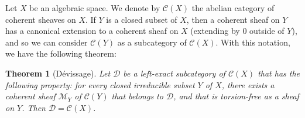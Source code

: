 \documentclass{article}
\theoremstyle{plain}
\newtheorem*{theorem}{Theorem}
\theoremstyle{definition}
\newcommand{\sh}{\mathscr}
\newcommand{\cat}{\mathcal}
\newcommand{\oldpage}[1]{\marginpar{\footnotesize$\Big\vert$ \textit{p.~#1}}}
\begin{document}
Let $X$ be an algebraic space.
We denote by $\cat{C}(X)$ the abelian category of coherent sheaves on $X$.
If $Y$ is a closed subset of $X$, then a coherent sheaf on $Y$ has a canonical extension to a coherent sheaf on $X$ (extending by $0$ outside of $Y$), and so we can consider $\cat{C}(Y)$ as a subcategory of $\cat{C}(X)$.
With this notation, we have the following theorem:

\oldpage{4-04}
\begin{theorem}[D\'{e}vissage]
\label{theorem-devissage}
  Let $\cat{D}$ be a left-exact subcategory of $\cat{C}(X)$ that has the following property:
  for every closed irreducible subset $Y$ of $X$, there exists a coherent sheaf $\sh{M}_Y$ of $\cat{C}(Y)$ that belongs to $\cat{D}$, and that is torsion-free as a sheaf on $Y$.
  Then $\cat{D}=\cat{C}(X)$.
\end{theorem}
\end{document}
